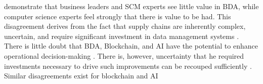 \textcite{rossmannFutureSocialImpact2018} demonstrate that business leaders and SCM experts see little value in BDA, while computer science experts feel strongly that there is value to be had. This disagreement derives from the fact that supply chains are inherently complex, uncertain, and require significant investment in data management systems \parencite{govindanSupplyChainNetwork2017}. There is little doubt that BDA, Blockchain, and AI have the potential to enhance operational decision-making \parencite{gunasekaranInformationTechnologyCompetitive2017}. There is, however, uncertainty that he required investments necessary to drive such improvements can be recouped sufficiently \parencite{arunachalamUnderstandingBigData2018}. Similar disagreements exist for blockchain \parencite{kouhizadehBlockchainTechnologySustainable2021} and AI \parencite{nedsiArtificialIntelligenceSupply2019}
